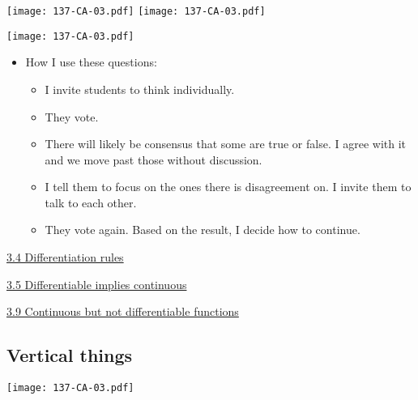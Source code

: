 \documentclass[11pt]{article}
\newcommand{\nl}{\hfill \vspace{-1.1\baselineskip}} %
\newcommand{\viv}{\hspace{8mm} \href{https://www.youtube.com/watch?v=k_VxtK1U9jk&list=PLlwePzQY_wW8qiZD6XYqCnibdY37ygbx7&index=4}{3.4 Differentiation rules}}
\newcommand{\vv}{\hspace{8mm} \href{https://www.youtube.com/watch?v=QQbiHHiqTXo&list=PLlwePzQY_wW8qiZD6XYqCnibdY37ygbx7&index=5}{3.5 Differentiable implies continuous}}
\newcommand{\vix}{\hspace{8mm} \href{https://www.youtube.com/watch?v=QBmUyi64zf8&list=PLlwePzQY_wW8qiZD6XYqCnibdY37ygbx7&index=9}{3.9 Continuous but not differentiable functions}}
\begin{document}
\begin{center}
{ \texttt{[image: 137-CA-03.pdf]}} \quad
{ \texttt{[image: 137-CA-03.pdf]}}

{ \texttt{[image: 137-CA-03.pdf]}} 

\end{center}


\begin{comments}
\nl
	\begin{itemize}
		\item  How I use these questions:
			\begin{itemize}
				\item I invite students to think individually.
				\item They vote. 
				\item There will likely be consensus that some are true or false.  I agree with it and we move past those without discussion.
				\item I tell them to focus on the ones there is disagreement on.  I invite them to talk to each other.
				\item They vote again.  Based on the result, I decide how to continue.
			\end{itemize}
	\end{itemize}
	
\end{comments}

\begin{videos}
\viv

\vv

\vix

\end{videos}

\newpage

\subsection{Vertical things} 

\begin{center}
{ \texttt{[image: 137-CA-03.pdf]}} 
\end{center}
\end{document}
